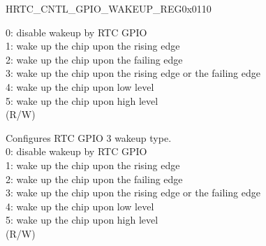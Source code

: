 \begin{register}{H}{RTC\_CNTL\_GPIO\_WAKEUP\_REG}{0x0110}
\begin{regdesc}
\begin{reglist}
0: disable wakeup by RTC GPIO\\
1: wake up the chip upon the rising edge\\
2: wake up the chip upon the failing edge\\
3: wake up the chip upon the rising edge or the failing edge\\
4: wake up the chip upon low level\\
5: wake up the chip upon high level\\
(R/W)
\label{fielddesc:RTCCNTLGPIOPIN3INTTYPE}\item [RTC\_CNTL\_GPIO\_PIN3\_INT\_TYPE] Configures RTC GPIO 3 wakeup type.\\
0: disable wakeup by RTC GPIO\\
1: wake up the chip upon the rising edge\\
2: wake up the chip upon the failing edge\\
3: wake up the chip upon the rising edge or the failing edge\\
4: wake up the chip upon low level\\
5: wake up the chip upon high level\\
(R/W)

\item [Continued on the next page...]
\end{reglist}\end{regdesc}
\end{register}
\addtocounter{Regfloat}{-1}
